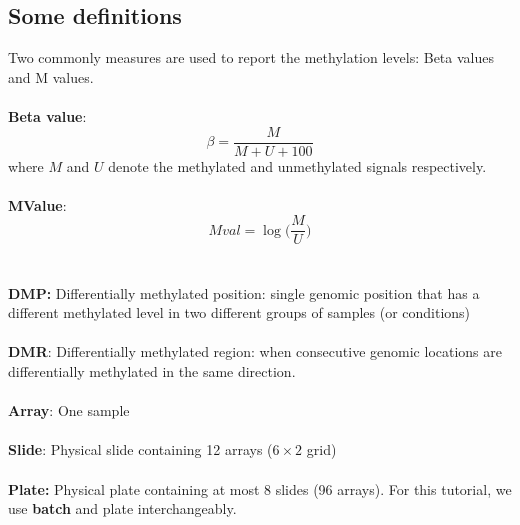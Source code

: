 \documentclass[12pt]{article}
\begin{document}
\subsection*{Some definitions}
Two commonly measures are used to report the methylation levels: Beta values and M values. \\
\\
\textbf{Beta value}: 
\begin{equation*}
\beta = \frac{M}{M + U + 100}
\end{equation*}
where $M$ and $U$ denote the methylated and unmethylated signals respectively. 
\\
\\
\textbf{MValue}:
\begin{equation*}
Mval = \log{\biggl(\frac{M}{U}\biggr)}
\end{equation*}
\\
\\
\textbf{DMP:}  Differentially methylated position: single genomic position that has a different methylated level in two different groups of samples (or conditions)
\\
\\
\textbf{DMR}: Differentially methylated region: when consecutive genomic locations are differentially methylated in the same direction. 
\\
\\
\textbf{Array}: One sample 
\\
\\
\textbf{Slide}: Physical slide containing 12 arrays ($6 \times 2$ grid)
\\
\\
\textbf{Plate:} Physical plate containing at most 8 slides (96 arrays). For this tutorial, we use \textbf{batch} and plate interchangeably. 
\\
\\
\end{document}
